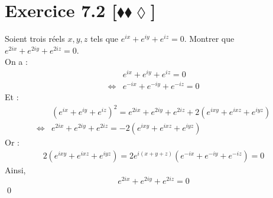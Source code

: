 \documentclass[10pt]{article}
\begin{document}
\section*{Exercice 7.2 [$\blacklozenge\blacklozenge\lozenge$]}
\begin{tcolorbox}[enhanced, width=7in, center, size=fbox, fontupper=\large, drop shadow southwest]
    Soient trois réels $x,y,z$ tels que $e^{ix} + e^{iy} + e^{iz} = 0$. Montrer que $e^{2ix} + e^{2iy} + e^{2iz}=0$.\\
    On a :
    \begin{align*}
        &e^{ix}+e^{iy}+e^{iz}=0\\
        \iff&e^{-ix}+e^{-iy}+e^{-iz}=0
    \end{align*}
    Et :
    \begin{align*}
        &(e^{ix}+e^{iy}+e^{iz})^2 = e^{2ix} + e^{2iy} + e^{2iz} + 2(e^{ixy} + e^{ixz} + e^{iyz})\\
        \iff&e^{2ix}+e^{2iy}+e^{2iz}=-2(e^{ixy}+e^{ixz}+e^{iyz})
    \end{align*}
    Or :
    \begin{align*}
        2(e^{ixy}+e^{ixz}+e^{iyz}) = 2e^{i(x+y+z)}(e^{-ix}+e^{-iy}+e^{-iz})=0
    \end{align*}
    Ainsi,
    \begin{equation*}
        e^{2ix}+e^{2iy}+e^{2iz}=0
    \end{equation*}
    \qed
\end{tcolorbox}

\end{document}
